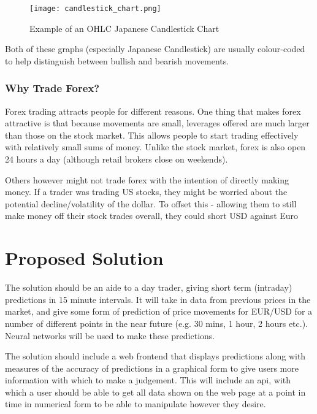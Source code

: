             \begin{figure}[h]
                \centering
                \texttt{[image: candlestick\_chart.png]}
                \caption{Example of an OHLC Japanese Candlestick Chart \cite{candlestick_OHLC}}
                \label{fig:candlestick_ex}
            \end{figure}

            Both of these graphs (especially Japanese Candlestick) are usually colour-coded to help distinguish between bullish and bearish movements.
        


            \subsubsection{Why Trade Forex?}
            Forex trading attracts people for different reasons. One thing that makes forex attractive is that because movements are small, leverages offered are much larger than those on the stock market. This allows people to start trading effectively with relatively small sums of money. Unlike the stock market, forex is also open 24 hours a day (although retail brokers close on weekends).

            Others however might not trade forex with the intention of directly making money. If a trader was trading US stocks, they might be worried about the potential decline/volatility of the dollar. To offset this - allowing them to still make money off their stock trades overall, they could short USD against Euro\cite{investopedia_beginner}



    \section{Proposed Solution}

    The solution should be an aide to a day trader, giving short term (intraday) predictions in 15 minute intervals. It will take in data from previous prices in the market, and give some form of prediction of price movements for EUR/USD for a number of different points in the near future (e.g. 30 mins, 1 hour, 2 hours etc.). Neural networks will be used to make these predictions.

    The solution should include a web frontend that displays predictions along with measures of the accuracy of predictions in a graphical form to give users more information with which to make a judgement. This will include an api, with which a user should be able to get all data shown on the web page at a point in time in numerical form to be able to manipulate however they desire.

